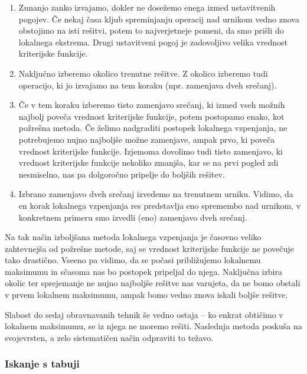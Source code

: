 \documentclass[a4paper,10pt]{article}
\begin{document}
\begin{enumerate}
   

   \item Zunanjo zanko izvajamo, dokler ne dosežemo enega izmed ustavitvenih pogojev.
   Če nekaj časa kljub spreminjanju operacij nad urnikom vedno znova obstojimo na isti
   rešitvi, potem to najverjetneje pomeni, da smo prišli do lokalnega ekstrema. Drugi
   ustavitveni pogoj je zadovoljivo velika vrednost kriterijske funkcije.

  \item  Naključno izberemo okolico trenutne rešitve. Z okolico izberemo tudi operacijo,
   ki jo izvajamo na tem koraku (npr. zamenjava dveh srečanj).

  \item Če v tem koraku izberemo tisto zamenjavo srečanj, ki izmed vseh možnih najbolj
   poveča vrednost kriterijske funkcije, potem postopamo enako, kot požrešna metoda. Če
   želimo nadgraditi postopek lokalnega vzpenjanja, ne potrebujemo nujno najboljše možne
   zamenjave, ampak prvo, ki poveča vrednost kriterijske funkcije. Izjemoma dovolimo tudi
   tisto zamenjavo, ki vrednost kriterijske funkcije nekoliko zmanjša, kar se na prvi
   pogled zdi nesmiselno, nas pa dolgoročno pripelje do boljših rešitev.

  \item Izbrano zamenjavo dveh srečanj izvedemo na trenutnem urniku. Vidimo, da en korak
   lokalnega vzpenjanja res predstavlja eno spremembo nad urnikom, v konkretnem primeru
   smo izvedli (eno) zamenjavo dveh srečanj.
   \end{enumerate}
\noindent

Na tak način izboljšana metoda lokalnega vzpenjanja je časovno veliko zahtevnejša od
požrešne metode, saj se vrednost kriterijske funkcije ne povečuje tako drastično. Vseeno
pa vidimo, da se počasi približujemo lokalnemu maksimumu in sčasoma nas bo postopek
pripeljal do njega. Naključna izbira okolic ter sprejemanje ne nujno najboljše rešitve
nas varujeta, da ne bomo obstali v prvem lokalnem maksimumu, ampak bomo vedno znova
iskali boljše rešitve.

Slabost do sedaj obravnavanih tehnik še vedno ostaja -- ko enkrat obtičimo v lokalnem
maksimumu, se iz njega ne moremo rešiti. Naslednja metoda poskuša na svojevrsten, a zelo
sistematičen način odpraviti to težavo.

 \subsubsection{Iskanje s tabuji}
\end{document}
